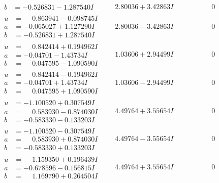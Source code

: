 \documentclass[1p]{elsarticle_modified}
\theoremstyle{definition}
\begin{document}
$$\begin{array}{c|c|c}
\begin{aligned}
b &= -0.526831 - 1.287540 I\end{aligned}
 & \phantom{-}2.80036 + 3.42863 I & \phantom{-0.000000 } 0 \\ \hline\begin{aligned}
u &= \phantom{-}0.863941 - 0.098745 I \\
a &= -0.065027 + 1.127290 I \\
b &= -0.526831 + 1.287540 I\end{aligned}
 & \phantom{-}2.80036 - 3.42863 I & \phantom{-0.000000 } 0 \\ \hline\begin{aligned}
u &= \phantom{-}0.842414 + 0.194962 I \\
a &= -0.04701 - 1.43734 I \\
b &= \phantom{-}0.047595 - 1.090590 I\end{aligned}
 & \phantom{-}1.03606 + 2.94499 I & \phantom{-0.000000 } 0 \\ \hline\begin{aligned}
u &= \phantom{-}0.842414 - 0.194962 I \\
a &= -0.04701 + 1.43734 I \\
b &= \phantom{-}0.047595 + 1.090590 I\end{aligned}
 & \phantom{-}1.03606 - 2.94499 I & \phantom{-0.000000 } 0 \\ \hline\begin{aligned}
u &= -1.100520 + 0.307549 I \\
a &= \phantom{-}0.583930 - 0.874030 I \\
b &= -0.583330 - 0.133203 I\end{aligned}
 & \phantom{-}4.49764 + 3.55654 I & \phantom{-0.000000 } 0 \\ \hline\begin{aligned}
u &= -1.100520 - 0.307549 I \\
a &= \phantom{-}0.583930 + 0.874030 I \\
b &= -0.583330 + 0.133203 I\end{aligned}
 & \phantom{-}4.49764 - 3.55654 I & \phantom{-0.000000 } 0 \\ \hline\begin{aligned}
u &= \phantom{-}1.159350 + 0.196439 I \\
a &= -0.678596 - 0.156815 I \\
b &= \phantom{-}1.169790 + 0.264504 I\end{aligned}
 & \phantom{-}4.49764 + 3.55654 I & \phantom{-0.000000 } 0 \\ \hline\begin{aligned}

\end{aligned}
\end{array}$$
\end{document}
